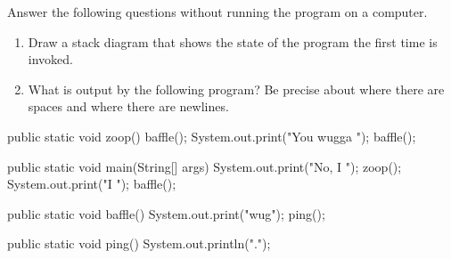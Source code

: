 \begin{exercise}  %

Answer the following questions without running the program on a computer.

\begin{enumerate}

\item Draw a stack diagram that shows the state of the program the first time  is invoked.

\item What is output by the following program?
Be precise about where there are spaces and where there are newlines.



\end{enumerate}

\begin{code}
public static void zoop() {
    baffle();
    System.out.print("You wugga ");
    baffle();
}
\end{code}

\begin{code}
public static void main(String[] args) {
    System.out.print("No, I ");
    zoop();
    System.out.print("I ");
    baffle();
}
\end{code}

\begin{code}
public static void baffle() {
    System.out.print("wug");
    ping();
}
\end{code}

\begin{code}
public static void ping() {
    System.out.println(".");
}
\end{code}

\end{exercise}


